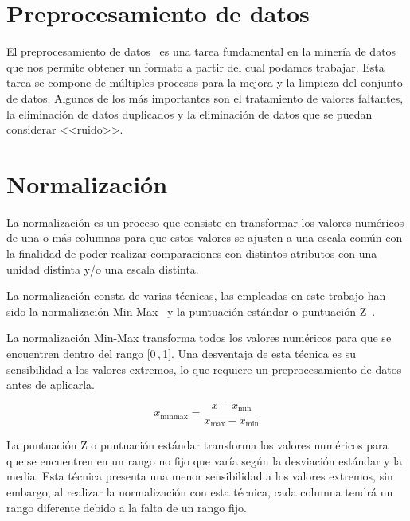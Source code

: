 
\section{Preprocesamiento de datos}

El preprocesamiento de datos~\cite{preprocesamiento} es una tarea fundamental en la minería de datos que nos permite obtener un formato a partir del cual podamos trabajar. Esta tarea se compone de múltiples procesos para la mejora y la limpieza del conjunto de datos. Algunos de los más importantes son el tratamiento de valores faltantes, la eliminación de datos duplicados y la eliminación de datos que se puedan considerar <<ruido>>.

\section{Normalización}

La normalización es un proceso que consiste en transformar los valores numéricos de una o más columnas para que estos valores se ajusten a una escala común con la finalidad de poder realizar comparaciones con distintos atributos con una unidad distinta y/o una escala distinta.

\par

La normalización consta de varias técnicas, las empleadas en este trabajo han sido la normalización Min-Max~\cite{normalización:minmax} y la puntuación estándar o puntuación Z~\cite{normalización:estandar}.

\par

La normalización Min-Max transforma todos los valores numéricos para que se encuentren dentro del rango [0\,,\,1]. Una desventaja de esta técnica es su sensibilidad a los valores extremos, lo que requiere un preprocesamiento de datos antes de aplicarla.

\[x_{\text{minmax}} = \frac{{x - x_{\text{min}}}}{{x_{\text{max}} - x_{\text{min}}}}\]

\par

La puntuación Z o puntuación estándar transforma los valores numéricos para que se encuentren en un rango no fijo que varía según la desviación estándar y la media. Esta técnica presenta una menor sensibilidad a los valores extremos, sin embargo, al realizar la normalización con esta técnica, cada columna tendrá un rango diferente debido a la falta de un rango fijo.

